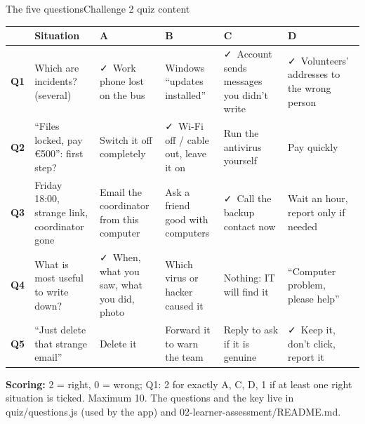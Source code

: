 \documentclass[aspectratio=169,11pt,t]{beamer}
\newcommand\file[1]{{\ttfamily\color{navy}#1}}
\newcommand\yes{\textcolor{good}{\faCheck}}
\begin{document}
\begin{frame}{The five questions}{Challenge 2 \textbullet{} quiz content}
  \vspace{0mm}
  \begin{card}[left=3mm, right=3mm, top=1.5mm, bottom=1mm, after skip=1.5mm]
    \tiny\setlength\tabcolsep{2.5pt}\renewcommand{\arraystretch}{1.2}
    \begin{tabular}{@{}L{5mm}L{28mm}L{21mm}L{21mm}L{21mm}L{21mm}@{}}
      & \textcolor{muted}{Situation} & \textcolor{muted}{A} & \textcolor{muted}{B} & \textcolor{muted}{C} & \textcolor{muted}{D}\\\midrule
      \textbf{Q1} & Which are incidents? (several) & \textcolor{good}{\yes\ Work phone lost on the bus} & Windows ``updates installed'' & \textcolor{good}{\yes\ Account sends messages you didn't write} & \textcolor{good}{\yes\ Volunteers' addresses to the wrong person}\\
      \textbf{Q2} & ``Files locked, pay €500'': first step? & Switch it off completely & \textcolor{good}{\yes\ Wi-Fi off / cable out, leave it on} & Run the antivirus yourself & Pay quickly\\
      \textbf{Q3} & Friday 18:00, strange link, coordinator gone & Email the coordinator from this computer & Ask a friend good with computers & \textcolor{good}{\yes\ Call the backup contact now} & Wait an hour, report only if needed\\
      \textbf{Q4} & What is most useful to write down? & \textcolor{good}{\yes\ When, what you saw, what you did, photo} & Which virus or hacker caused it & Nothing: IT will find it & ``Computer problem, please help''\\
      \textbf{Q5} & ``Just delete that strange email'' & Delete it & Forward it to warn the team & Reply to ask if it is genuine & \textcolor{good}{\yes\ Keep it, don't click, report it}\\
    \end{tabular}
  \end{card}
  {\scriptsize\textbf{Scoring:} 2 = right, 0 = wrong; Q1: 2 for exactly A, C, D, 1 if at least one right situation is ticked. Maximum 10. The questions and the key live in \file{quiz/questions.js} (used by the app) and \file{02-learner-assessment/README.md}.\par}
\end{frame}
\end{document}
